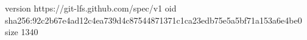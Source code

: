 version https://git-lfs.github.com/spec/v1
oid sha256:92c2b67e4ad12c4ea739d4c87544871371c1ca23edb75e5a5bf71a153a6e4be0
size 1340
